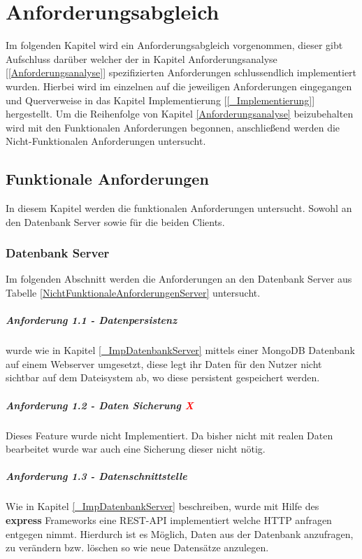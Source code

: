 \chapter{Anforderungsabgleich} \label{Anforderungsabgleich}
Im folgenden Kapitel wird ein Anforderungsabgleich vorgenommen, dieser gibt Aufschluss darüber welcher der in Kapitel Anforderungsanalyse [\ref{Anforderungsanalyse}] spezifizierten Anforderungen schlussendlich implementiert wurden.
Hierbei wird im einzelnen auf die jeweiligen Anforderungen eingegangen und Querverweise in das Kapitel Implementierung [\ref{_Implementierung}] hergestellt. Um die Reihenfolge von Kapitel \ref{Anforderungsanalyse} beizubehalten wird mit den Funktionalen Anforderungen begonnen, anschließend werden die Nicht-Funktionalen Anforderungen untersucht.
\section{Funktionale Anforderungen}
In diesem Kapitel werden die funktionalen Anforderungen untersucht. Sowohl an den Datenbank Server sowie für die beiden Clients.
\subsection{Datenbank Server}
Im folgenden Abschnitt werden die Anforderungen an den Datenbank Server aus Tabelle \ref{NichtFunktionaleAnforderungenServer} untersucht.
\paragraph{Anforderung 1.1 - Datenpersistenz  \textcolor{green}{\checkmark}}
 wurde wie in Kapitel \ref{_ImpDatenbankServer} mittels einer MongoDB Datenbank auf einem Webserver umgesetzt, diese legt ihr Daten für den Nutzer nicht sichtbar auf dem Dateisystem ab, wo diese persistent gespeichert werden.

\paragraph{Anforderung 1.2 - Daten Sicherung  \textcolor{red}{X}}
Dieses Feature wurde nicht Implementiert. Da bisher nicht mit realen Daten bearbeitet wurde war auch eine Sicherung dieser nicht nötig.

\paragraph{Anforderung 1.3 - Datenschnittstelle \textcolor{green}{\checkmark}}
Wie in Kapitel \ref{_ImpDatenbankServer} beschreiben, wurde mit Hilfe des \textbf{express} Frameworks eine REST-API implementiert welche HTTP anfragen entgegen nimmt. Hierdurch ist es Möglich, Daten aus der Datenbank anzufragen, zu verändern bzw. löschen so wie neue Datensätze anzulegen.


